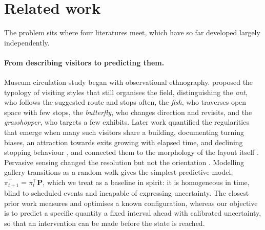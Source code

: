 \documentclass[11pt]{article}
\theoremstyle{plain}
\theoremstyle{definition}
\theoremstyle{remark}
\begin{document}
\section{Related work}
\label{sec:related}

The problem sits where four literatures meet, which have so far developed largely independently.

\paragraph{From describing visitors to predicting them.}
Museum circulation study began with observational ethnography. \citet{veron1983} proposed the typology of visiting styles that still organises the field, distinguishing the \emph{ant}, who follows the suggested route and stops often, the \emph{fish}, who traverses open space with few stops, the \emph{butterfly}, who changes direction and revisits, and the \emph{grasshopper}, who targets a few exhibits. Later work quantified the regularities that emerge when many such visitors share a building, documenting turning biases, an attraction towards exits growing with elapsed time, and declining stopping behaviour \citep{klein1993,bitgood2006}, and connected them to the morphology of the layout itself \citep{choi1999}. Pervasive sensing changed the resolution but not the orientation \citep{kanda2007,yoshimura2014louvre,uwbmuseum2026}. Modelling gallery transitions as a random walk \citep{yoshimura2019randomwalk} gives the simplest predictive model, $\pi_{t+1}^{\top} = \pi_t^{\top}\bm{P}$, which we treat as a baseline in spirit: it is homogeneous in time, blind to scheduled events and incapable of expressing uncertainty. The closest prior work \citep{centorrino2021museums} measures and optimises a known configuration, whereas our objective is to predict a specific quantity a fixed interval ahead with calibrated uncertainty, so that an intervention can be made before the state is reached.
\end{document}
